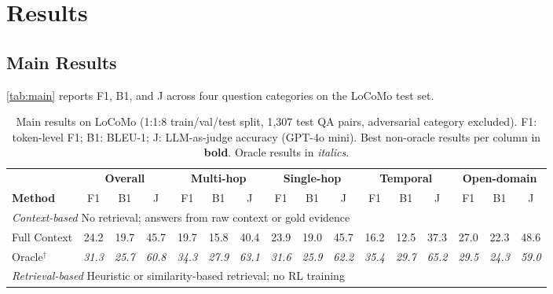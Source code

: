 \section{Results}

\subsection{Main Results}

\autoref{tab:main} reports F1, B1, and J across four question categories on the LoCoMo test set.

\begin{table}[t]
\centering
\caption{Main results on LoCoMo (1:1:8 train/val/test split, 1{,}307 test QA pairs, adversarial category excluded). F1: token-level F1; B1: BLEU-1; J: LLM-as-judge accuracy (GPT-4o mini). Best non-oracle results per column in \textbf{bold}. Oracle results in \textit{italics}.}
\label{tab:main}
\small
\setlength{\tabcolsep}{2.8pt}
\begin{tabular}{l @{\hskip 5pt} ccc @{\hskip 3pt} ccc @{\hskip 3pt} ccc @{\hskip 3pt} ccc @{\hskip 3pt} ccc}
\toprule
 & \multicolumn{3}{c}{\cellcolor{hdrOverall}\textbf{Overall}} & \multicolumn{3}{c}{\cellcolor{hdrMH}\textbf{Multi-hop}} & \multicolumn{3}{c}{\cellcolor{hdrSH}\textbf{Single-hop}} & \multicolumn{3}{c}{\cellcolor{hdrTemp}\textbf{Temporal}} & \multicolumn{3}{c}{\cellcolor{hdrOD}\textbf{Open-domain}} \\
\textbf{Method} & \cellcolor{hdrOverall}F1 & \cellcolor{hdrOverall}B1 & \cellcolor{hdrOverall}J & \cellcolor{hdrMH}F1 & \cellcolor{hdrMH}B1 & \cellcolor{hdrMH}J & \cellcolor{hdrSH}F1 & \cellcolor{hdrSH}B1 & \cellcolor{hdrSH}J & \cellcolor{hdrTemp}F1 & \cellcolor{hdrTemp}B1 & \cellcolor{hdrTemp}J & \cellcolor{hdrOD}F1 & \cellcolor{hdrOD}B1 & \cellcolor{hdrOD}J \\
\midrule
\multicolumn{16}{l}{\textit{Context-based} \hfill \scriptsize No retrieval; answers from raw context or gold evidence} \\[2pt]
Full Context & 24.2 & 19.7 & 45.7 & 19.7 & 15.8 & 40.4 & 23.9 & 19.0 & 45.7 & 16.2 & 12.5 & 37.3 & 27.0 & 22.3 & 48.6 \\
\rowcolor{rowOracle}Oracle$^\dagger$ & \textit{31.3} & \textit{25.7} & \textit{60.8} & \textit{34.3} & \textit{27.9} & \textit{63.1} & \textit{31.6} & \textit{25.9} & \textit{62.2} & \textit{35.4} & \textit{29.7} & \textit{65.2} & \textit{29.5} & \textit{24.3} & \textit{59.0} \\
\midrule
\multicolumn{16}{l}{\textit{Retrieval-based} \hfill \scriptsize Heuristic or similarity-based retrieval; no RL training} \\[2pt]

\end{tabular}
\end{table}
